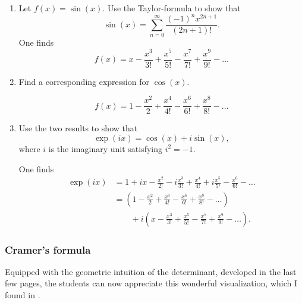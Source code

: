 \documentclass[10pt]{article}
\begin{document}
\begin{enumerate}
	\item Let $f(x)=\sin(x)$.  Use the Taylor-formula to show that
	\[
	\sin(x) = \sum_{n=0}^{\infty}  \frac{(-1)^n x^{2n+1}}{(2n+1)!}.
	\]
	One finds	
	\[
	f(x) = x -\frac{x^3}{3!} + \frac{x^5}{5!} - \frac{x^7}{7!} + \frac{x^9}{9!} - \ldots
	\]
	\item Find a corresponding expression for $\cos(x)$.
	
	\[
	f(x) = 1 - \frac{x^2}{2} +\frac{x^4}{4!} - \frac{x^6}{6!} + \frac{x^8}{8!} - \ldots
	\]
	
	\item Use the two results to show that 
	\[
	\exp(ix) = \cos(x) + i \sin(x),
 	\]
 	where $i$ is the imaginary unit satisfying $i^2=-1$.

	One finds	
	\begin{align*}
	\exp(ix) &= 1 +ix - \frac{x^2}{2!} - i\frac{x^3}{3!} + \frac{x^4}{4!} + i\frac{x^5}{5!} - \frac{x^6}{6!} - \ldots \\
	 &= \left( 1 - \frac{x^2}{2} +\frac{x^4}{4!} - \frac{x^6}{6!} + \frac{x^8}{8!} - \ldots \right) \\
	 & \qquad + i \left(  x -\frac{x^3}{3!} + \frac{x^5}{5!} - \frac{x^7}{7!} + \frac{x^9}{9!} - \ldots \right).
	\end{align*}
\end{enumerate}

\subsubsection{Cramer's formula}

Equipped with the geometric intuition of the determinant, developed in the last few pages, the students can now appreciate this wonderful visualization, which I found in \cite{Nelsen2000}.
\end{document}
